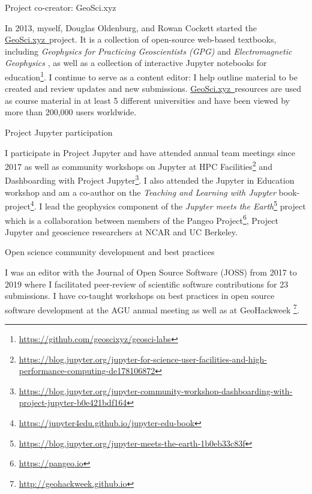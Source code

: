 \documentclass[a4paper, 11pt]{article}
\newcommand{\gpg}{\href{https://gpg.geosci.xyz}{https://gpg.geosci.xyz}}
\newcommand{\emgeosci}{\href{https://em.geosci.xyz}{https://em.geosci.xyz}}
\newcommand{\GeoSci}{\href{https://geosci.xyz}{GeoSci.xyz~}}
\newcommand{\subheading}[1]{
    \vspace{0.5cm}
    {\Large #1}\\
    \vspace{-0.2cm}
}
\begin{document}
\subheading{Project co-creator: GeoSci.xyz}

In 2013, myself, Douglas Oldenburg, and Rowan Cockett started the \GeoSci project. It is a collection of open-source web-based textbooks, including \emph{Geophysics for Practicing Geoscientists (GPG)}
and \emph{Electromagnetic Geophysics}
, as well as a collection of interactive Jupyter notebooks for education\footnote{\href{https://github.com/geoscixyz/geosci-labs}{https://github.com/geoscixyz/geosci-labs}}. I continue to serve as a content editor: I help outline material to be created and review updates and new submissions. \GeoSci resources are used as course material in at least 5 different universities and have been viewed by more than 200,000 users worldwide.

\subheading{Project Jupyter participation}

I participate in Project Jupyter and have attended annual team meetings since 2017 as well as community workshops on Jupyter at HPC Facilities\footnote{\href{https://blog.jupyter.org/jupyter-for-science-user-facilities-and-high-performance-computing-de178106872}{https://blog.jupyter.org/jupyter-for-science-user-facilities-and-high-performance-computing-de178106872}}
and Dashboarding with Project Jupyter\footnote{\href{https://blog.jupyter.org/jupyter-community-workshop-dashboarding-with-project-jupyter-b0e421bdf164}{https://blog.jupyter.org/jupyter-community-workshop-dashboarding-with-project-jupyter-b0e421bdf164}}.
I also attended the Jupyter in Education workshop and am a co-author on the \emph{Teaching and Learning with Jupyter} book-project\footnote{\href{https://jupyter4edu.github.io/jupyter-edu-book}{https://jupyter4edu.github.io/jupyter-edu-book}}. I lead the geophysics component of the \emph{Jupyter meets the Earth}\footnote{\href{https://blog.jupyter.org/jupyter-meets-the-earth-1b0eb33c83f}{https://blog.jupyter.org/jupyter-meets-the-earth-1b0eb33c83f}} project which is a collaboration between members of the Pangeo Project\footnote{\href{https://pangeo.io}{https://pangeo.io}}, Project Jupyter and geoscience researchers at NCAR and UC Berkeley.

\subheading{Open science community development and best practices}

I was an editor with the Journal of Open Source Software (JOSS) from 2017 to 2019 where I facilitated peer-review of scientific software contributions for 23 submissions. I have co-taught workshops on best practices in open source software development at the AGU annual meeting as well as at GeoHackweek
\footnote{\href{http://geohackweek.github.io}{http://geohackweek.github.io}}.
\end{document}
